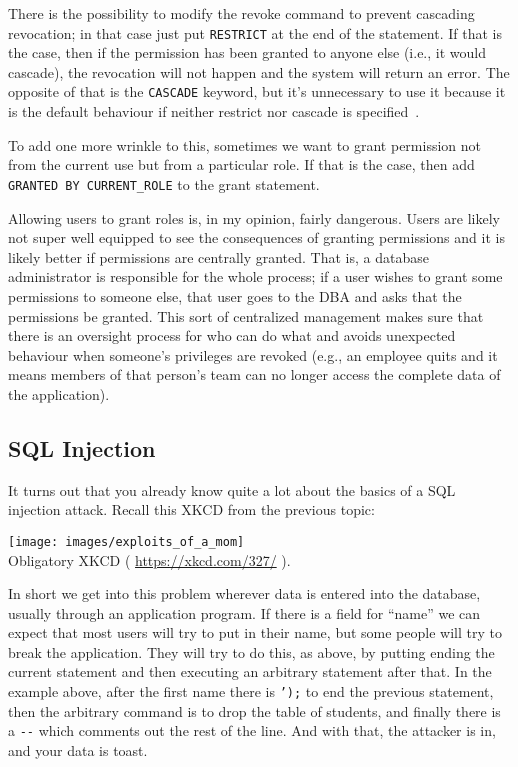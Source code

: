\documentclass[a4paper]{report}
\begin{document}
There is the possibility to modify the revoke command to prevent cascading revocation; in that case just put \texttt{RESTRICT} at the end of the statement. If that is the case, then if the permission has been granted to anyone else (i.e., it would cascade), the revocation will not happen and the system will return an error. The opposite of that is the \texttt{CASCADE} keyword, but it's unnecessary to use it because it is the default behaviour if neither restrict nor cascade is specified~\cite{dsc}.

To add one more wrinkle to this, sometimes we want to grant permission not from the current use but from a particular role. If that is the case, then add \texttt{GRANTED BY CURRENT\_ROLE} to the grant statement. 

Allowing users to grant roles is, in my opinion, fairly dangerous. Users are likely not super well equipped to see the consequences of granting permissions and it is likely better if permissions are centrally granted. That is, a database administrator is responsible for the whole process; if a user wishes to grant some permissions to someone else, that user goes to the DBA and asks that the permissions be granted. This sort of centralized management makes sure that there is an oversight process for who can do what and avoids unexpected behaviour when someone's privileges are revoked (e.g., an employee quits and it means members of that person's team can no longer access the complete data of the application).

\subsection*{SQL Injection}

It turns out that you already know quite a lot about the basics of a SQL injection attack. Recall this XKCD from the previous topic:

\begin{center}
\texttt{[image: images/exploits\_of\_a\_mom]}\\
Obligatory XKCD ( \url{https://xkcd.com/327/} ).
\end{center}

In short we get into this problem wherever data is entered into the database, usually through an application program. If there is a field for ``name'' we can expect that most users will try to put in their name, but some people will try to break the application. They will try to do this, as above, by putting ending the current statement and then executing an arbitrary statement after that. In the example above,  after the first name there is \texttt{');} to end the previous statement, then the arbitrary command is to drop the table of students, and finally there is a \texttt{-}\texttt{-} which comments out the rest of the line. And with that, the attacker is in, and your data is toast.
\end{document}
